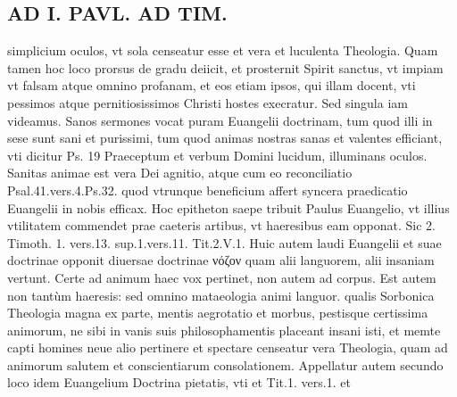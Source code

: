 \documentclass{article}
\begin{document}
\begin{pages}
\section*{AD I. PAVL. AD TIM. }
\marginpar{[ p.42o ]}\pstart simplicium oculos, vt sola censeatur esse et vera et luculenta Theologia. Quam tamen hoc loco prorsus de gradu deiicit, et prosternit Spirit sanctus, vt impiam vt falsam atque omnino profanam, et eos etiam ipsos, qui illam docent, vti pessimos atque pernitiosissimos Christi hostes execratur.  \pend\pstart Sed singula iam videamus. Sanos sermones vocat puram Euangelii doctrinam, tum quod illi in sese sunt sani et purissimi, tum quod animas nostras sanas et valentes efficiant, vti dicitur Ps. 19 Praeceptum et verbum Domini lucidum, illuminans oculos. Sanitas animae est vera Dei agnitio, atque cum eo reconciliatio Psal.41.vers.4.Ps.32. quod vtrunque beneficium affert syncera praedicatio Euangelii in nobis efficax. Hoc epitheton saepe tribuit Paulus Euangelio, vt illius vtilitatem commendet prae caeteris artibus, vt haeresibus eam opponat. Sic 2. Timoth. 1. vers.13. sup.1.vers.11. Tit.2.V.1. Huic autem laudi Euangelii et suae doctrinae opponit diuersae doctrinae νόζον quam alii languorem, alii insaniam vertunt. Certe ad animum haec vox pertinet, non autem ad corpus. Est autem non tantùm haeresis: sed omnino mataeologia animi languor. qualis Sorbonica Theologia magna ex parte, mentis aegrotatio et morbus, pestisque certissima animorum, ne sibi in vanis suis philosophamentis placeant insani isti, et memte capti homines neue alio pertinere et spectare censeatur vera Theologia, quam ad animorum salutem et conscientiarum consolationem.  \pend\pstart Appellatur autem secundo loco idem Euangelium Doctrina pietatis, vti et Tit.1. vers.1. et  \pend

\end{pages}
\end{document}
